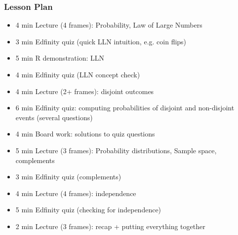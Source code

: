 \begin{frame}
    \frametitle{Lesson Plan}
    \begin{itemize}
        \item 4 min Lecture (4 frames): Probability, Law of Large Numbers
        \item 3 min Edfinity quiz (quick LLN intuition, e.g. coin flips)
        \item 5 min R demonstration: LLN
        \item 4 min Edfinity quiz (LLN concept check)
        \item 4 min Lecture (2+ frames): disjoint outcomes
        \item 6 min Edfinity quiz: computing probabilities of disjoint and non-disjoint events (several questions)
        \item 4 min Board work: solutions to quiz questions
        \item 5 min Lecture (3 frames): Probability distributions, Sample space, complements
        \item 3 min Edfinity quiz (complements)
        \item 4 min Lecture (4 frames): independence
        \item 5 min Edfinity quiz (checking for independence)
        \item 2 min Lecture (3 frames): recap + putting everything together
    \end{itemize}
\end{frame}





